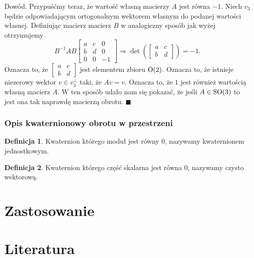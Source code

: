 \documentclass[a4paper,twoside,11pt,reqno]{mwrep}
\theoremstyle{plain} \newtheorem{twr}{Twierdzenie}
\theoremstyle{plain} \newtheorem{lem}{Lemat}
\theoremstyle{definition} \newtheorem{defi}{Definicja}
\theoremstyle{remark} \newtheorem*{wni}{Wniosek}
\theoremstyle{definition} \newtheorem{uwaga}{Uwaga}
\theoremstyle{definition}\newtheorem{prz}{Przykład}
\newenvironment{dowod}{\par\vspace{0.1cm}\par{\sc Dowód.}}{\hfill $\blacksquare$\par\vspace{0.4cm}\par}
\begin{document}
\begin{dowod}
Przypuśćmy teraz, że wartość własną macierzy $A$ jest równa $-1$. Niech $v_3$ będzie odpowiadającym
ortogonalnym wektorem własnym do podanej wartości własnej. Definiując macierz macierz $B$ w analogiczny
sposób jak wyżej otrzymujemy 
  $$B^{-1}AB\begin{bmatrix}
a&c   & 0\\
b&d & 0\\
0&0&-1
\end{bmatrix}\Longrightarrow \det\left(\begin{bmatrix}
a&c \\
b&d 
\end{bmatrix} \right) =-1.$$
Oznacza to, że $\begin{bmatrix}
a&c \\
b&d 
\end{bmatrix}$ jest elementem zbioru $\textup{O}(2)$. Oznacza to, że istnieje niezerowy wektor 
$v\in v^\perp_3$ taki, że $Av=v$. Oznacza  to, że $1$ jest również wartością własną macierz $A$.
W ten sposób udało nam się pokazać, że jeśli $A\in\textup{SO}(3)$ to jest ona tak naprawdę macierzą
obrotu.  
\end{dowod}
\subsection{Opis kwaternionowy obrotu w przestrzeni }
\begin{defi}
Kwaternion którego moduł jest równy $0$, nazywamy kwaternionem jednostkowym.
\end{defi}
\begin{defi}
Kwaternion którego część skalarna jest równa $0$, nazywamy czysto wektorową.
\end{defi}
\chapter{Zastosowanie}
\chapter{Literatura}
\end{document}
